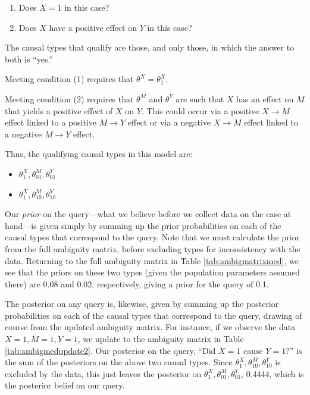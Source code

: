 \documentclass[
  12pt,
]{book}
\providecommand{\tightlist}{%
  \setlength{\itemsep}{0pt}\setlength{\parskip}{0pt}}
\begin{document}
\begin{enumerate}
\def\labelenumi{\arabic{enumi}.}
\item
  Does \(X=1\) in this case?
\item
  Does \(X\) have a positive effect on \(Y\) in this case?
\end{enumerate}

The causal types that qualify are those, and only those, in which the answer to both is ``yes.''

Meeting condition (1) requires that \(\theta^X=\theta^X_1\).

Meeting condition (2) requires that \(\theta^M\) and \(\theta^Y\) are such that \(X\) has an effect on \(M\) that yields a positive effect of \(X\) on \(Y\). This could occur via a positive \(X \rightarrow M\) effect linked to a positive \(M \rightarrow Y\) effect or via a negative \(X \rightarrow M\) effect linked to a negative \(M \rightarrow Y\) effect.

Thus, the qualifying causal types in this model are:

\begin{itemize}
\tightlist
\item
  \(\theta^X_1, \theta^M_{01}, \theta^Y_{01}\)
\item
  \(\theta^X_1, \theta^M_{10}, \theta^Y_{10}\)
\end{itemize}

Our \emph{prior} on the query---what we believe before we collect data on the case at hand---is given simply by summing up the prior probabilities on each of the causal types that correspond to the query. Note that we must calculate the prior from the full ambiguity matrix, before excluding types for inconsistency with the data. Returning to the full ambiguity matrix in Table \ref{tab:ambigmatrixmed}, we see that the priors on these two types (given the population parameters assumed there) are 0.08 and 0.02, respectively, giving a prior for the query of 0.1.

The posterior on any query is, likewise, given by summing up the posterior probabilities on each of the causal types that correspond to the query, drawing of course from the updated ambiguity matrix. For instance, if we observe the data \(X=1, M=1, Y=1\), we update to the ambiguity matrix in Table \ref{tab:ambigmedupdate2}. Our posterior on the query, ``Did \(X=1\) cause \(Y=1\)?'' is the sum of the posteriors on the above two causal types. Since \(\theta^X_1, \theta^M_{10}, \theta^Y_{10}\) is excluded by the data, this just leaves the posterior on \(\theta^X_1, \theta^M_{01}, \theta^Y_{01}\), 0.4444, which is the posterior belief on our query.
\end{document}
